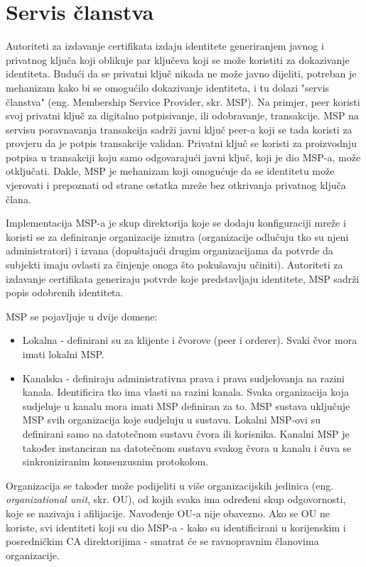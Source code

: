 \documentclass[times, utf8, diplomski]{fer}
\begin{document}
\section{Servis članstva}
Autoriteti za izdavanje certifikata izdaju identitete generiranjem javnog i privatnog ključa koji oblikuje par ključeva koji se može koristiti za dokazivanje identiteta. Budući da se privatni ključ nikada ne može javno dijeliti, potreban je mehanizam kako bi se omogućilo dokazivanje identiteta,  i tu dolazi "servis članstva" (eng. Membership Service Provider, skr. MSP). Na primjer, peer koristi svoj privatni ključ za digitalno potpisivanje, ili odobravanje,  transakcije. MSP na servisu poravnavanja transakcija sadrži javni ključ peer-a koji se tada koristi za provjeru da je potpis transakcije validan. Privatni ključ se koristi za proizvodnju potpisa u transakciji koju samo odgovarajući javni ključ, koji je dio MSP-a,  može otključati.  Dakle, MSP je mehanizam koji omogućuje da se identitetu može vjerovati i prepoznati od strane ostatka mreže bez otkrivanja privatnog ključa člana. \cite{Fabric}

Implementacija MSP-a je skup direktorija koje se dodaju konfiguraciji mreže i koristi se za definiranje organizacije iznutra (organizacije odlučuju tko su njeni administratori) i izvana (dopuštajući drugim organizacijama da potvrde da subjekti imaju ovlasti za činjenje onoga što pokušavaju učiniti). Autoriteti za izdavanje certifikata generiraju potvrde koje predstavljaju identitete,  MSP sadrži popis odobrenih identiteta.

MSP se pojavljuje u dvije domene:
\begin{itemize}
\item Lokalna - definirani su za klijente i čvorove (peer i orderer). Svaki čvor mora imati lokalni MSP.
\item Kanalska - definiraju administrativna prava i prava sudjelovanja na razini kanala.  Identificira tko ima vlasti na razini kanala.  Svaka organizacija koja sudjeluje u kanalu mora imati MSP definiran za to.  MSP sustava uključuje MSP svih organizacija koje sudjeluju u sustavu.  Lokalni MSP-ovi su definirani samo na datotečnom sustavu čvora ili korisnika.  Kanalni MSP je također instanciran na datotečnom sustavu svakog čvora u kanalu i čuva se sinkroniziranim konsenzusnim protokolom.
\end{itemize}

Organizacija se također može podijeliti u više organizacijskih jedinica (eng. \textit{organizational unit}, skr. OU), od kojih svaka ima određeni skup odgovornosti, koje se nazivaju i afilijacije.   Navođenje OU-a nije obavezno. Ako se OU ne koriste, svi identiteti koji su dio MSP-a - kako su identificirani u korijenskim i posredničkim CA direktorijima - smatrat će se ravnopravnim članovima organizacije.
\end{document}
